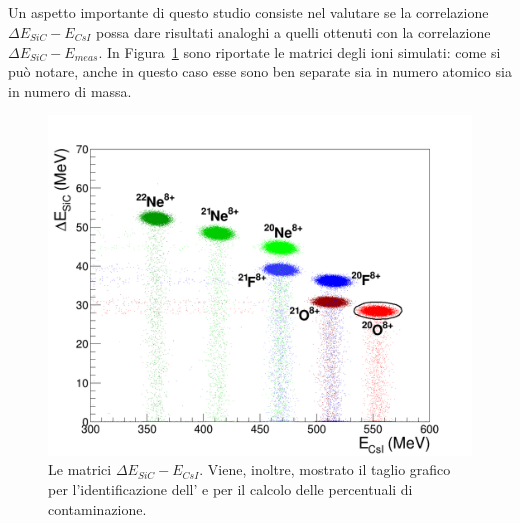 \subsection*{}

Un aspetto importante di questo studio consiste nel valutare se la correlazione $\Delta E_{SiC} - E_{CsI}$ possa dare risultati analoghi a quelli ottenuti con la correlazione $\Delta E_{SiC} - E_{meas}$. 
In Figura~\ref{fig:deltaE_Ecsi} sono riportate le matrici degli ioni simulati: come si può notare, anche in questo caso esse sono ben separate sia in numero atomico sia in numero di massa.
\begin{figure} [!p]
	\centering
	\includegraphics[width=\textwidth, keepaspectratio]{Grafici_Tesi2/PIDnew/deltaE_Ecsi_quadrata_taglio_menoeventi.png}
	\caption{Le matrici $\Delta E_{SiC} - E_{CsI}$. Viene, inoltre, mostrato il taglio grafico per l'identificazione dell' e per il calcolo delle percentuali di contaminazione.} \label{fig:deltaE_Ecsi}
\end{figure}
